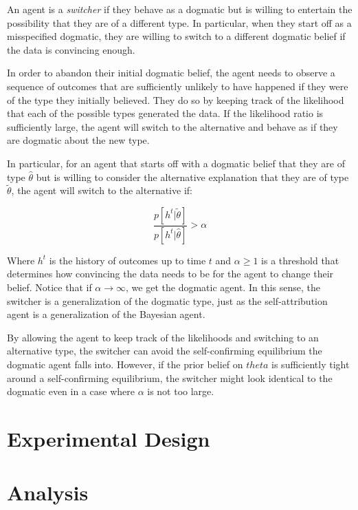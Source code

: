 \documentclass[
  12pt,
]{article}
\begin{document}
An agent is a \emph{switcher} if they behave as a dogmatic but is
willing to entertain the possibility that they are of a different type.
In particular, when they start off as a misspecified dogmatic, they are
willing to switch to a different dogmatic belief if the data is
convincing enough.

In order to abandon their initial dogmatic belief, the agent needs to
observe a sequence of outcomes that are sufficiently unlikely to have
happened if they were of the type they initially believed. They do so by
keeping track of the likelihood that each of the possible types
generated the data. If the likelihood ratio is sufficiently large, the
agent will switch to the alternative and behave as if they are dogmatic
about the new type.

In particular, for an agent that starts off with a dogmatic belief that
they are of type \(\hat{\theta}\) but is willing to consider the
alternative explanation that they are of type \(\tilde{\theta}\), the
agent will switch to the alternative if:

\[\frac{p[h^t|\tilde{\theta}]}{p[h^t|\hat{\theta}]} > \alpha\]

Where \(h^t\) is the history of outcomes up to time \(t\) and
\(\alpha \geq 1\) is a threshold that determines how convincing the data
needs to be for the agent to change their belief. Notice that if
\(\alpha \to \infty\), we get the dogmatic agent. In this sense, the
switcher is a generalization of the dogmatic type, just as the
self-attribution agent is a generalization of the Bayesian agent.

By allowing the agent to keep track of the likelihoods and switching to
an alternative type, the switcher can avoid the self-confirming
equilibrium the dogmatic agent falls into. However, if the prior belief
on \(theta\) is sufficiently tight around a self-confirming equilibrium,
the switcher might look identical to the dogmatic even in a case where
\(\alpha\) is not too large.

\hypertarget{experimental-design}{%
\section{Experimental Design}\label{experimental-design}}

\hypertarget{analysis}{%
\section{Analysis}\label{analysis}}

\renewcommand\refname{Conclusion}
  
\end{document}
